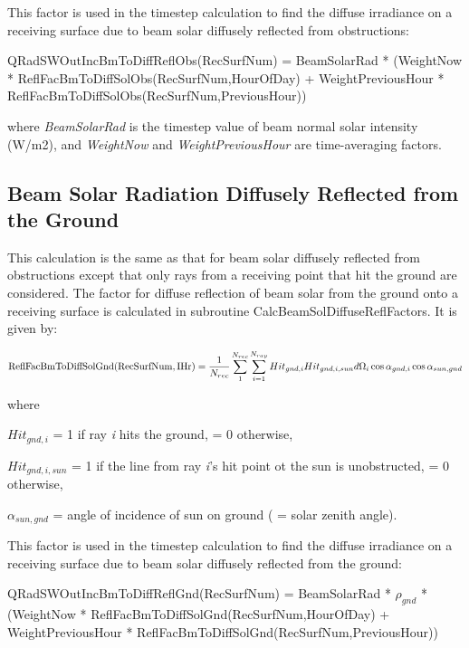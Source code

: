 This factor is used in the timestep calculation to find the diffuse irradiance on a receiving surface due to beam solar diffusely reflected from obstructions:

QRadSWOutIncBmToDiffReflObs(RecSurfNum) = BeamSolarRad * (WeightNow * ReflFacBmToDiffSolObs(RecSurfNum,HourOfDay) + WeightPreviousHour * ReflFacBmToDiffSolObs(RecSurfNum,PreviousHour))

where \emph{BeamSolarRad} is the timestep value of beam normal solar intensity (W/m2), and \emph{WeightNow} and \emph{WeightPreviousHour} are time-averaging factors.

\subsection{Beam Solar Radiation Diffusely Reflected from the Ground}\label{beam-solar-radiation-diffusely-reflected-from-the-ground}

This calculation is the same as that for beam solar diffusely reflected from obstructions except that only rays from a receiving point that hit the ground are considered. The factor for diffuse reflection of beam solar from the ground onto a receiving surface is calculated in subroutine CalcBeamSolDiffuseReflFactors. It is given by:

{\scriptsize
\begin{equation}
{\rm{ReflFacBmToDiffSolGnd(RecSurfNum,IHr)}} = \frac{1}{{{N_{rec}}}}\sum\limits_1^{{N_{rec}}} {\sum\limits_{i = 1}^{{N_{ray}}} {Hi{t_{gnd,i}}Hi{t_{gnd,i,sun}}d{\Omega_i}\cos {\alpha_{gnd,i}}\cos {\alpha_{sun,gnd}}} }
\end{equation}}

where

\(Hi{t_{gnd,i}}\) = 1 if ray \emph{i} hits the ground, = 0 otherwise,

\(Hi{t_{gnd,i,sun}}\) = 1 if the line from ray \emph{i}'s hit point ot the sun is unobstructed, = 0 otherwise,

\({\alpha_{sun,gnd}}\) = angle of incidence of sun on ground ( = solar zenith angle).

This factor is used in the timestep calculation to find the diffuse irradiance on a receiving surface due to beam solar diffusely reflected from the ground:

QRadSWOutIncBmToDiffReflGnd(RecSurfNum) = BeamSolarRad * \({\rho_{gnd}}\) * (WeightNow * ReflFacBmToDiffSolGnd(RecSurfNum,HourOfDay) + WeightPreviousHour * ReflFacBmToDiffSolGnd(RecSurfNum,PreviousHour))

